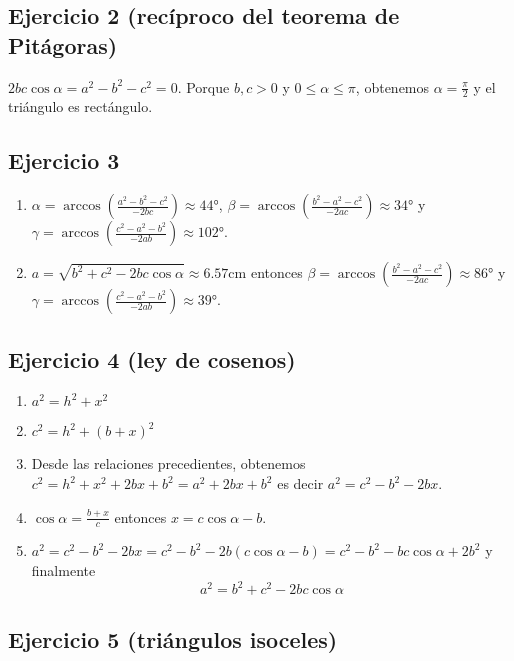 \subsection{Ejercicio 2 (recíproco del teorema de Pitágoras)}

$2bc \cos \alpha = a^2 - b^2 - c^2 = 0$. Porque $b, c > 0$ y
$0 \leq \alpha \leq \pi$, obtenemos $\alpha = \frac{\pi}{2}$ y el triángulo
es rectángulo.

\subsection{Ejercicio 3}

\begin{enumerate}
  \item 
    $\alpha =
    \arccos \left( \frac{a^2-b^2-c^2}{-2bc} \right) \approx 
    44°$,
    $\beta =
    \arccos \left( \frac{b^2-a^2-c^2}{-2ac} \right) \approx 34°$ y
    $\gamma =
    \arccos \left( \frac{c^2-a^2-b^2}{-2ab} \right) \approx 102°$.
  \item 
    $a = \sqrt{b^2 + c^2 - {2bc \cos \alpha}} \approx 
    6.57 \text{cm}$ entonces
    $\beta =
    \arccos \left( \frac{b^2-a^2-c^2}{-2ac} \right) \approx 86°$ y
    $\gamma =
    \arccos \left( \frac{c^2-a^2-b^2}{-2ab} \right) \approx 39°$.
\end{enumerate}

\subsection{Ejercicio 4 (ley de cosenos)}

\begin{enumerate}
\item $a^2 = h^2 + x^2$
\item $c^2 = h^2 + \left(b+x\right)^2$
\item Desde las relaciones precedientes, obtenemos
  $c^2 = h^2 + x^2 + {2bx} + b^2 = a^2 + {2bx} + b^2$ es decir
  $a^2 = c^2 - b^2 - {2bx}$.
\item $\cos \alpha = \frac{b+x}{c}$ entonces
  $x = {c \cos \alpha} - b$.
\item $a^2 = c^2 - b^2 - {2bx} = 
  c^2 - b^2 - {2b \left( {c \cos \alpha} - b \right)} =
  c^2 - b^2 - {bc\cos \alpha} + 2b^2$ y finalmente
  $$a^2 = b^2 + c^2 - {2bc \cos\alpha}$$
\end{enumerate}

\subsection{Ejercicio 5 (triángulos isoceles)}

